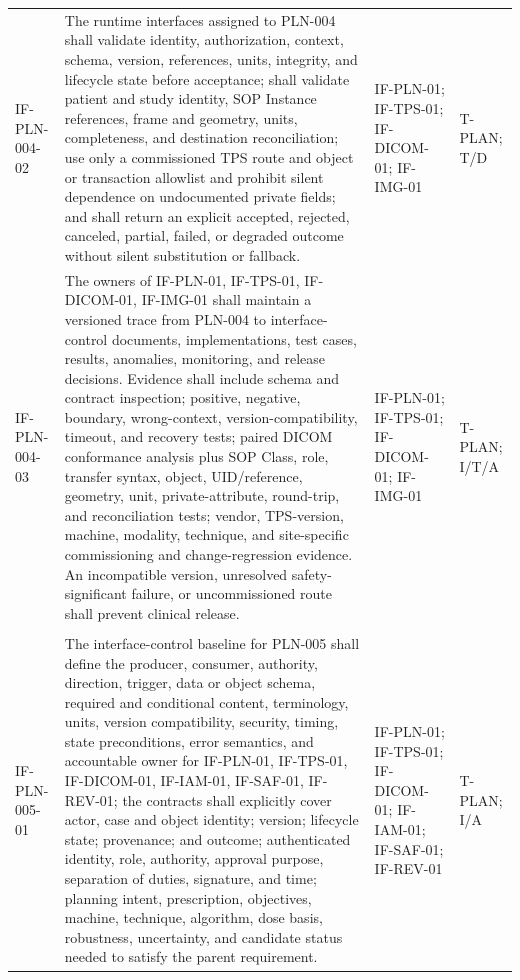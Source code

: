 \documentclass[11pt,letterpaper]{article}
\begin{document}
\begin{scriptsize}
\begin{longtable}{@{}L{0.14\textwidth}L{0.49\textwidth}L{0.19\textwidth}L{0.10\textwidth}@{}}
\addlinespace[2pt]
\mbox{IF-PLN-004-02} & The runtime interfaces assigned to PLN-004 shall validate identity, authorization, context, schema, version, references, units, integrity, and lifecycle state before acceptance; shall validate patient and study identity, SOP Instance references, frame and geometry, units, completeness, and destination reconciliation; use only a commissioned TPS route and object or transaction allowlist and prohibit silent dependence on undocumented private fields; and shall return an explicit accepted, rejected, canceled, partial, failed, or degraded outcome without silent substitution or fallback. & IF-PLN-01; IF-TPS-01; IF-DICOM-01; IF-IMG-01 & T-PLAN; T\slash\allowbreak{}D \\
\addlinespace[2pt]
\mbox{IF-PLN-004-03} & The owners of IF-PLN-01, IF-TPS-01, IF-DICOM-01, IF-IMG-01 shall maintain a versioned trace from PLN-004 to interface-control documents, implementations, test cases, results, anomalies, monitoring, and release decisions. Evidence shall include schema and contract inspection; positive, negative, boundary, wrong-context, version-compatibility, timeout, and recovery tests; paired DICOM conformance analysis plus SOP Class, role, transfer syntax, object, UID\slash\allowbreak{}reference, geometry, unit, private-attribute, round-trip, and reconciliation tests; vendor, TPS-version, machine, modality, technique, and site-specific commissioning and change-regression evidence. An incompatible version, unresolved safety-significant failure, or uncommissioned route shall prevent clinical release. & IF-PLN-01; IF-TPS-01; IF-DICOM-01; IF-IMG-01 & T-PLAN; I\slash\allowbreak{}T\slash\allowbreak{}A \\
\addlinespace[2pt]
 \\
\addlinespace[2pt]
\mbox{IF-PLN-005-01} & The interface-control baseline for PLN-005 shall define the producer, consumer, authority, direction, trigger, data or object schema, required and conditional content, terminology, units, version compatibility, security, timing, state preconditions, error semantics, and accountable owner for IF-PLN-01, IF-TPS-01, IF-DICOM-01, IF-IAM-01, IF-SAF-01, IF-REV-01; the contracts shall explicitly cover actor, case and object identity; version; lifecycle state; provenance; and outcome; authenticated identity, role, authority, approval purpose, separation of duties, signature, and time; planning intent, prescription, objectives, machine, technique, algorithm, dose basis, robustness, uncertainty, and candidate status needed to satisfy the parent requirement. & IF-PLN-01; IF-TPS-01; IF-DICOM-01; IF-IAM-01; IF-SAF-01; IF-REV-01 & T-PLAN; I\slash\allowbreak{}A \\

\end{longtable}
\end{scriptsize}
\end{document}
